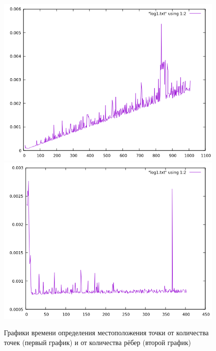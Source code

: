 \begin{figure}[h]
  \includegraphics[scale=0.5]{../plots/finding.png}
  \includegraphics[scale=0.5]{../plots/finding2.png}
  \caption{
    Графики времени определения местоположения точки от количества точек (первый график) и от количества рёбер (второй график)
  }
\end{figure}

\pagebreak
